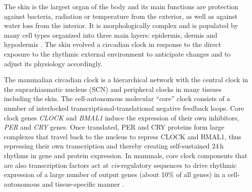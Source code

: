 The skin is the largest organ of the body and its main functions are protection against bacteria, radiation or temperature from the exterior, as well as against water loss from the interior\cite{Wong2016}. It is morphologically complex and is populated by many cell types organized into three main layers: epidermis, dermis and hypodermis \cite{Plikus2015}. The skin evolved a circadian clock \cite{Allada2021} in response to the direct exposure to the rhythmic external environment to anticipate changes and to adjust its physiology accordingly. 

\newpage

The mammalian circadian clock is a hierarchical network with the central clock in the suprachiasmatic nucleus (SCN) and peripheral clocks in many tissues including the skin. The cell-autonomous molecular ``core'' clock \cite{Takahashi2017, Dibner2010} consists of a number of interlocked transcriptional-translational negative feedback loops. Core clock genes \textit{CLOCK} and \textit{BMAL1} induce the expression of their own inhibitors, \textit{PER} and \textit{CRY} genes. Once translated, PER and CRY proteins form large complexes that travel back to the nucleus to repress CLOCK and BMAL1, thus repressing their own transcription and thereby creating self-sustained 24\,h rhythms in gene and protein expression. In mammals, core clock components that are also transcription factors act at \textit{cis}-regulatory sequences to drive rhythmic expression of a large number of output genes (about 10\% of all genes) in a cell-autonomous and tissue-specific manner \cite{Zhang2014, Ruben2018}.

